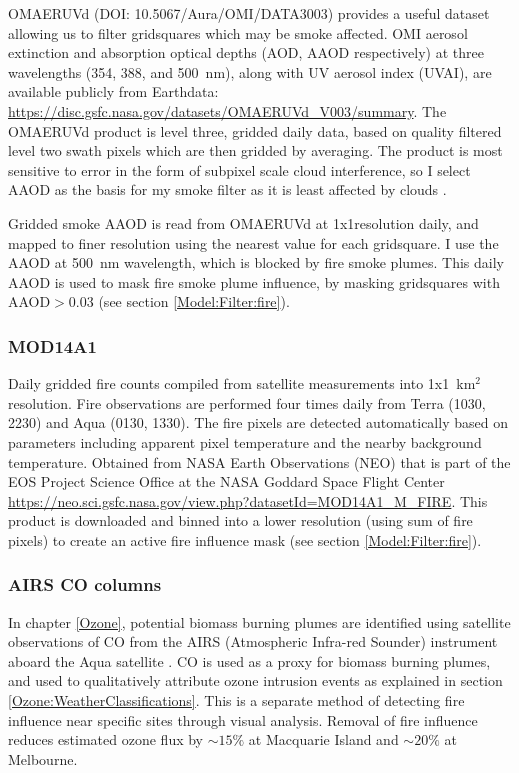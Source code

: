       
      OMAERUVd (DOI: 10.5067/Aura/OMI/DATA3003) provides a useful dataset allowing us to filter gridsquares which may be smoke affected.
      OMI aerosol extinction and absorption optical depths (AOD, AAOD respectively) at three wavelengths (354, 388, and 500~nm), along with UV aerosol index (UVAI), are available publicly from Earthdata: \url{https://disc.gsfc.nasa.gov/datasets/OMAERUVd_V003/summary}.
      The OMAERUVd product is level three, gridded daily data, based on quality filtered level two swath pixels which are then gridded by averaging.
      The product is most sensitive to error in the form of subpixel scale cloud interference, so I select AAOD as the basis for my smoke filter as it is least affected by clouds \parencite{Ahn2008}.
      
      Gridded smoke AAOD is read from OMAERUVd at 1x1\degr resolution daily, and mapped to finer resolution using the nearest value for each gridsquare.
      I use the AAOD at 500~nm wavelength, which is blocked by fire smoke plumes.
      This daily AAOD is used to mask fire smoke plume influence, by masking gridsquares with AAOD$>0.03$ (see section \ref{Model:Filter:fire}).
    
    \subsubsection{MOD14A1}
      \label{Model:Datasets:MOD14A1}
      Daily gridded fire counts compiled from satellite measurements into 1x1~km$^2$ resolution.
      Fire observations are performed four times daily from Terra (1030, 2230) and Aqua (0130, 1330).
      The fire pixels are detected automatically based on parameters including apparent pixel temperature and the nearby background temperature.
      Obtained from NASA Earth Observations (NEO) that is part of the EOS Project Science Office at the NASA Goddard Space Flight Center \url{https://neo.sci.gsfc.nasa.gov/view.php?datasetId=MOD14A1_M_FIRE}.
      This product is downloaded and binned into a lower resolution (using sum of fire pixels) to create an active fire influence mask (see section \ref{Model:Filter:fire}).
      
    \subsubsection{AIRS CO columns}
      \label{Model:Datasets:AIRS}
      
      In chapter \ref{Ozone}, potential biomass burning plumes are identified using satellite observations of CO from the AIRS (Atmospheric Infra-red Sounder) instrument aboard the Aqua satellite \parencite{AIRS3STD}.
      CO is used as a proxy for biomass burning plumes, and used to qualitatively attribute ozone intrusion events as explained in section \ref{Ozone:WeatherClassifications}.
      This is a separate method of detecting fire influence near specific sites through visual analysis.
      Removal of fire influence reduces estimated ozone flux by $\sim 15\%$ at Macquarie Island and $\sim 20\%$ at Melbourne.
      
